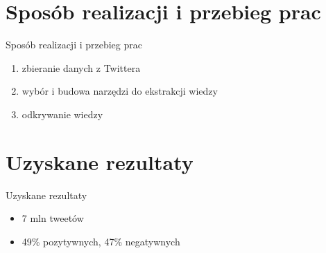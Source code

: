 \documentclass{beamer}
\begin{document}
\section{Sposób realizacji i przebieg prac}
\begin{frame}{Sposób realizacji i przebieg prac}
\begin{enumerate}
  \item zbieranie danych z Twittera
  
  \item wybór i budowa narzędzi do ekstrakcji wiedzy
  
  \item odkrywanie wiedzy
  
\end{enumerate}

\end{frame}

\section{Uzyskane rezultaty}
\begin{frame}{Uzyskane rezultaty}
\begin{itemize}
  \item 7 mln tweetów  
  \item 49\% pozytywnych, 47\% negatywnych
\end{itemize}
\end{frame}
\end{document}
